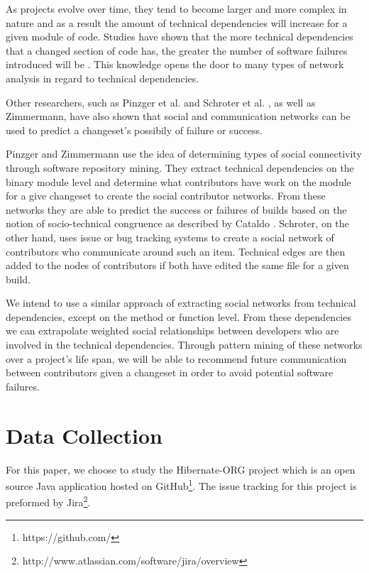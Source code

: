 \documentclass[conference]{IEEEtran}
\begin{document}
As projects evolve over time, they tend to become larger and more complex in nature and as
a result the amount of technical dependencies will increase for a given module of code.
Studies have shown that the more technical dependencies that a changed section of code has,
the greater the number of software failures introduced will be \cite{Zimmermann:2008:PDU}. 
This knowledge opens the door to many types of network analysis in regard to technical dependencies.

Other researchers, such as Pinzger et al. \cite{Pinzger:2008:DNP} and Schroter et al.
 \cite{Schroter:2010:PBO}, as well as Zimmermann\cite{Zimmermann:2008:PDU}, have also shown that
social and communication networks can be used to predict a changeset's possibily of failure or
success.

Pinzger and Zimmermann use the idea of determining types of social connectivity through 
software repository mining. They extract technical dependencies on the binary module level and
determine what contributors have work on the module for a give changeset to create the social
contributor networks. From these networks they are able to predict the success or failures of
builds based on the notion of socio-technical congruence as described by Cataldo \cite{Cataldo:2006:ICR}.
Schroter, on the other hand, uses issue or bug tracking systems to create a social network of
contributors who communicate around such an item. Technical edges are then added to the
nodes of contributors if both have edited the same file for a given build.

We intend to use a similar approach of extracting social networks from technical dependencies, 
except on the method or function level. From these dependencies we can extrapolate weighted
social relationships between developers who are involved in the technical dependencies. Through
pattern mining of these networks over a project's life span, we will be able to recommend future
communication between contributors given a changeset in order to avoid potential software
failures.


\section{Data Collection}
For this paper, we choose to study the Hibernate-ORG project which is an open source Java 
application hosted on GitHub\footnote{https://github.com/}. 
The issue tracking for this project is preformed by Jira\footnote{http://www.atlassian.com/software/jira/overview}.
\end{document}
